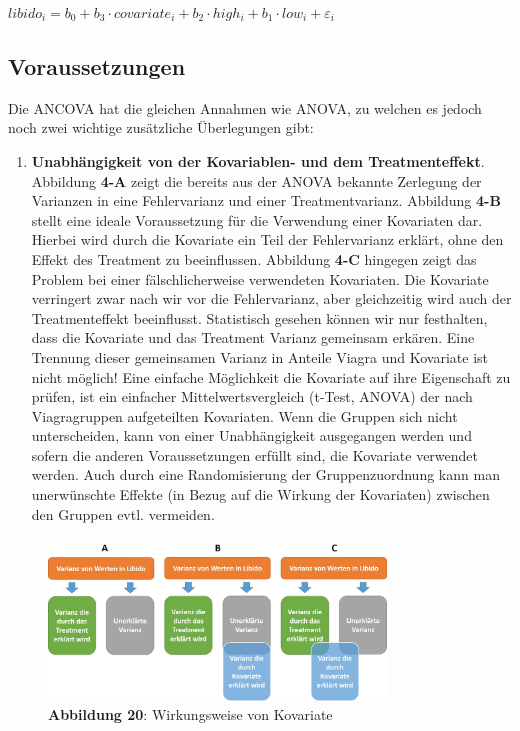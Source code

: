 \documentclass[]{article}
\providecommand{\tightlist}{%
  \setlength{\itemsep}{0pt}\setlength{\parskip}{0pt}}
\begin{document}
\(libido_i = b_0 + b_3 \cdot covariate_i + b_2 \cdot high_i + b_1 \cdot low_i + \varepsilon_i\)

\hypertarget{voraussetzungen}{%
\subsection*{Voraussetzungen}\label{voraussetzungen}}

Die ANCOVA hat die gleichen Annahmen wie ANOVA, zu welchen es jedoch noch zwei wichtige zusätzliche Überlegungen gibt:

\begin{enumerate}
\def\labelenumi{\arabic{enumi}.}
\tightlist
\item
  \textbf{Unabhängigkeit von der Kovariablen- und dem Treatmenteffekt}.
  Abbildung \textbf{4-A} zeigt die bereits aus der ANOVA bekannte Zerlegung der Varianzen in eine Fehlervarianz und einer Treatmentvarianz. Abbildung \textbf{4-B} stellt eine ideale Voraussetzung für die Verwendung einer Kovariaten dar. Hierbei wird durch die Kovariate ein Teil der Fehlervarianz erklärt, ohne den Effekt des Treatment zu beeinflussen. Abbildung \textbf{4-C} hingegen zeigt das Problem bei einer fälschlicherweise verwendeten Kovariaten. Die Kovariate verringert zwar nach wir vor die Fehlervarianz, aber gleichzeitig wird auch der Treatmenteffekt beeinflusst. Statistisch gesehen können wir nur festhalten, dass die Kovariate und das Treatment Varianz gemeinsam erkären. Eine Trennung dieser gemeinsamen Varianz in Anteile Viagra und Kovariate ist nicht möglich!
  Eine einfache Möglichkeit die Kovariate auf ihre Eigenschaft zu prüfen, ist ein einfacher Mittelwertsvergleich (t-Test, ANOVA) der nach Viagragruppen aufgeteilten Kovariaten. Wenn die Gruppen sich nicht unterscheiden, kann von einer Unabhängigkeit ausgegangen werden und sofern die anderen Voraussetzungen erfüllt sind, die Kovariate verwendet werden. Auch durch eine Randomisierung der Gruppenzuordnung kann man unerwünschte Effekte (in Bezug auf die Wirkung der Kovariaten) zwischen den Gruppen evtl. vermeiden.
\end{enumerate}

\begin{figure}
\centering
\includegraphics[width=0.8\textwidth,height=\textheight]{Images/Kovarianz_Field_11_2.jpg}
\caption{\textbf{Abbildung 20}: Wirkungsweise von Kovariate}
\end{figure}
\end{document}
